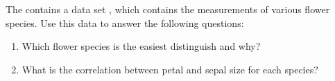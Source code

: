 \begin{problem}
The  contains a data set , which contains the measurements of various flower species.
Use this data to answer the following questions:
\begin{enumerate}
\item Which flower species is the easiest distinguish and why?

\item What is the correlation between petal and sepal size for each species?
\end{enumerate}
\end{problem}

